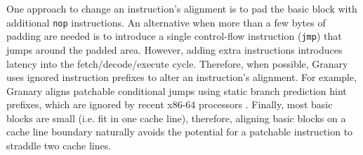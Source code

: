 \documentclass[preprint]{sigplanconf}
\begin{document}

One approach to change an instruction's alignment is to pad the basic block with additional \texttt{nop} instructions. An alternative when more than a few bytes of padding are needed is to introduce a single control-flow instruction (\texttt{jmp}) that jumps around the padded area. However, adding extra instructions introduces latency into the fetch/decode/execute cycle. Therefore, when possible, Granary uses ignored instruction prefixes to alter an instruction's alignment. For example, Granary aligns patchable conditional jumps using static branch prediction hint prefixes, which are ignored by recent x86-64 processors \cite{AgnerMicroarchitecture}. Finally, most basic blocks are small (i.e. fit in one cache line), therefore, aligning basic blocks on a cache line boundary naturally avoids the potential for a patchable instruction to straddle two cache lines.
\end{document}
